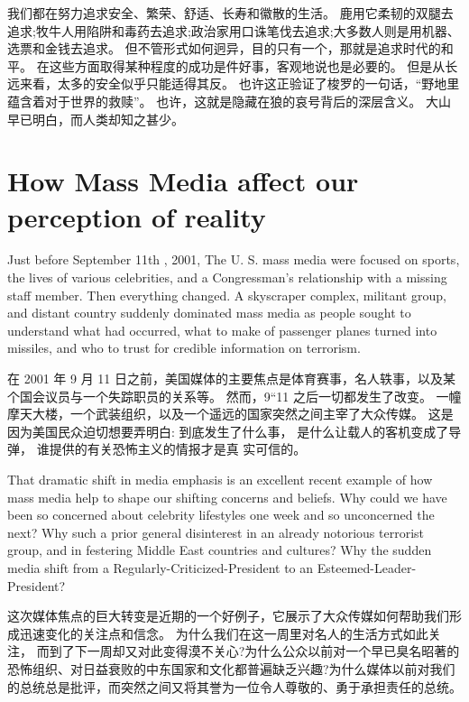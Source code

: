 \documentclass[cs4size, a4paper, 12pt]{article}
\newcounter{numpar}
\newcommand*{\newpar}{\numpar{}}
\begin{document}
	我们都在努力追求安全、繁荣、舒适、长寿和徽散的生活。 鹿用它柔韧的双腿去追求;牧牛人用陷阱和毒药去追求;政治家用口诛笔伐去追求;大多数人则是用机器、选票和金钱去追求。 但不管形式如何迥异，目的只有一个，那就是追求时代的和平。 在这些方面取得某种程度的成功是件好事，客观地说也是必要的。 但是从长远来看，太多的安全似乎只能适得其反。 也许这正验证了梭罗的一句话，``野地里蕴含着对于世界的救赎''。 也许，这就是隐藏在狼的哀号背后的深层含义。 大山早已明白，而人类却知之甚少。 
	
	
	
	\section{ How Mass Media affect our perception of reality}
	\setcounter{numpar}{0}
	
	\newpar Just before September 11th , 2001, The U. S. mass media were focused on sports, the lives of various celebrities, and a Congressman's relationship with a missing staff member. Then everything changed. A skyscraper complex, militant group, and distant country suddenly dominated mass media as people sought to understand what had occurred, what to make of passenger planes turned into missiles, and who to trust for credible information on terrorism. 
	
	在 2001 年 9 月 11 日之前，美国媒体的主要焦点是体育赛事，名人轶事，以及某个国会议员与一个失踪职员的关系等。 然而，9``11 之后一切都发生了改变。 一幢摩天大楼，一个武装组织，以及一个遥远的国家突然之间主宰了大众传媒。  这是因为美国民众迫切想要弄明白: 到底发生了什么事， 是什么让载人的客机变成了导弹， 谁提供的有关恐怖主义的情报才是真 实可信的。 
	
	\newpar That dramatic shift in media emphasis is an excellent recent example of how mass media help to shape our shifting concerns and beliefs. Why could we have been so concerned about celebrity lifestyles one week and so unconcerned the next? Why such a prior general disinterest in an already notorious terrorist group, and in festering Middle East countries and cultures? Why the sudden media shift from a Regularly-Criticized-President to an Esteemed-Leader-President?
	
	这次媒体焦点的巨大转变是近期的一个好例子，它展示了大众传媒如何帮助我们形成迅速变化的关注点和信念。 为什么我们在这一周里对名人的生活方式如此关注， 而到了下一周却又对此变得漠不关心?为什么公众以前对一个早已臭名昭著的恐怖组织、对日益衰败的中东国家和文化都普遍缺乏兴趣?为什么媒体以前对我们的总统总是批评，而突然之间又将其誉为一位令人尊敬的、勇于承担责任的总统。 
	
\end{document}
